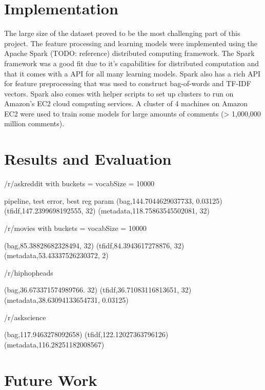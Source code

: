 \documentclass[11pt, twocolumn]{article}
\begin{document}
\section{Implementation}
	The large size of the dataset proved to be the most challenging part of this project. The feature processing and learning models were implemented using the Apache Spark (TODO: reference) distributed computing framework. The Spark framework was a good fit due to it's capabilities for distributed computation and that it comes with a API for all many learning models. Spark also has a rich API for feature preprocessing that was used to construct bag-of-words and TF-IDF vectors. Spark also comes with helper scripts to set up clusters to run on Amazon's EC2 cloud computing services. A cluster of 4 machines on Amazon EC2 were used to train some models for large amounts of comments (> 1,000,000 million comments). 


\section{Results and Evaluation}

/r/askreddit with buckets = vocabSize = 10000

pipeline, test error, best reg param
(bag,144.7044629037733, 0.03125)
(tfidf,147.2399698192555, 32)
(metadata,118.75863545502081, 32)

/r/movies with buckets = vocabSize = 10000

(bag,85.38828682328494, 32)
(tfidf,84.3943617278876, 32)
(metadata,53.43337526230372, 2)

/r/hiphopheads

(bag,36.673371574989766. 32)
(tfidf,36.71083116813651, 32)
(metadata,38.63094133654731, 0.03125)

/r/askscience

(bag,117.9463278092658)
(tfidf,122.12027363796126)
(metadata,116.28251182008567)


\section{Future Work}





\end{document}
